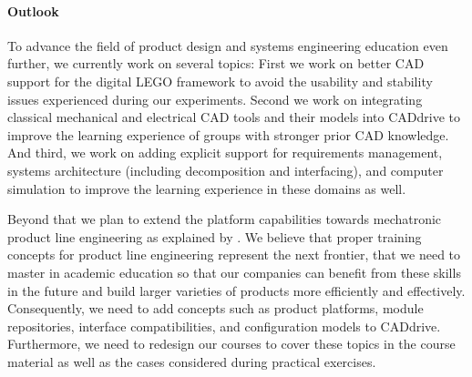 \documentclass{PDS}
\begin{document}
\paragraph{Outlook}

To advance the field of product design and systems engineering education even further, we currently work on several topics:
First we work on better CAD support for the digital LEGO framework to avoid the usability and stability issues experienced during our experiments.
Second we work on integrating classical mechanical and electrical CAD tools and their models into CADdrive to improve the learning experience of groups with stronger prior CAD knowledge.
And third, we work on adding explicit support for requirements management, systems architecture (including decomposition and interfacing), and computer simulation to improve the learning experience in these domains as well.

Beyond that we plan to extend the platform capabilities towards mechatronic product line engineering as explained by \citet{Michalek_2011}.
We believe that proper training concepts for product line engineering represent the next frontier, that we need to master in academic education so that our companies can benefit from these skills in the future and build larger varieties of products more efficiently and effectively.
Consequently, we need to add concepts such as product platforms, module repositories, interface compatibilities, and configuration models to CADdrive.
Furthermore, we need to redesign our courses to cover these topics in the course material as well as the cases considered during practical exercises.
\end{document}
